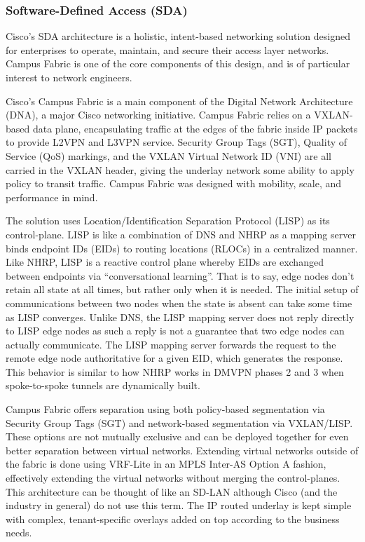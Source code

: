 \subsubsection{Software-Defined Access (SDA)}
Cisco's SDA architecture is a holistic, intent-based networking solution
designed for enterprises to operate, maintain, and secure their access layer
networks. Campus Fabric is one of the core components of this design, and is
of particular interest to network engineers.

Cisco’s Campus Fabric is a main component of the Digital Network Architecture
(DNA), a major Cisco networking initiative. Campus Fabric relies on a
VXLAN-based data plane, encapsulating traffic at the edges of the fabric
inside IP packets to provide L2VPN and L3VPN service. Security Group Tags
(SGT), Quality of Service (QoS) markings, and the VXLAN Virtual Network ID
(VNI) are all carried in the VXLAN header, giving the underlay network some
ability to apply policy to transit traffic. Campus Fabric was designed with
mobility, scale, and performance in mind.

The solution uses Location/Identification Separation Protocol (LISP) as its
control-plane. LISP is like a combination of DNS and NHRP as a mapping server
binds endpoint IDs (EIDs) to routing locations (RLOCs) in a centralized
manner. Like NHRP, LISP is a reactive control plane whereby EIDs are exchanged
between endpoints via ``conversational learning''. That is to say, edge nodes
don’t retain all state at all times, but rather only when it is needed. The
initial setup of communications between two nodes when the state is absent can
take some time as LISP converges. Unlike DNS, the LISP mapping server does not
reply directly to LISP edge nodes as such a reply is not a guarantee that two
edge nodes can actually communicate. The LISP mapping server forwards the
request to the remote edge node authoritative for a given EID, which generates
the response. This behavior is similar to how NHRP works in DMVPN phases 2 and
3 when spoke-to-spoke tunnels are dynamically built.

Campus Fabric offers separation using both policy-based segmentation via
Security Group Tags (SGT) and network-based segmentation via VXLAN/LISP\@. These
options are not mutually exclusive and can be deployed together for even
better separation between virtual networks. Extending virtual networks outside
of the fabric is done using VRF-Lite in an MPLS Inter-AS Option A fashion,
effectively extending the virtual networks without merging the control-planes.
This architecture can be thought of like an SD-LAN although Cisco (and the
industry in general) do not use this term. The IP routed underlay is kept
simple with complex, tenant-specific overlays added on top according to the
business needs.


